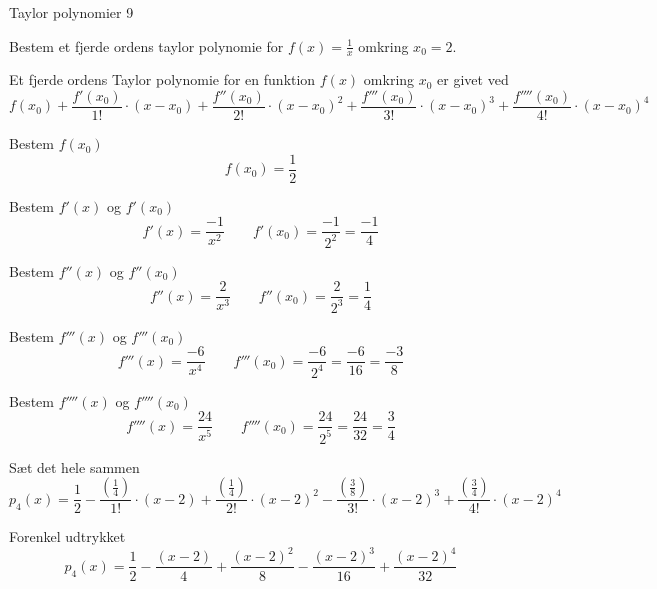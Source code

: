 \documentclass{article}
\begin{document}
\begin{exercise}{Taylor polynomier 9}
	
	Bestem et fjerde ordens taylor polynomie for $f(x) = \frac{1}{x}$
	omkring $x_0 = 2$.
	
	
	\hint
	Et fjerde ordens Taylor polynomie for en funktion $f(x)$
	omkring $x_0$ er givet ved
	\[
	f(x_0) + \frac{f'(x_0)}{1!} \cdot (x - x_0) 
	+ \frac{f''(x_0)}{2!} \cdot (x - x_0)^2 
	+ \frac{f'''(x_0)}{3!} \cdot (x - x_0)^3 
	+ \frac{f''''(x_0)}{4!} \cdot (x - x_0)^4
	\]
	
	
	\hint
	Bestem $f(x_0)$
	\[
	f(x_0)  = \frac{1}{2} 
	\]
	
	\hint
	Bestem $f'(x)$ og $f'(x_0)$
	\[
	f'(x) =  \frac{-1}{x^2} \qquad f'(x_0)= \frac{-1}{2^2} = \frac{-1}{4}
	\]
	
	\hint
	Bestem $f''(x)$ og $f''(x_0)$
	\[
	f''(x) = \frac{2}{x^3} \qquad f''(x_0)  = \frac{2}{2^3} = \frac{1}{4}
	\]
	
	\hint
	Bestem $f'''(x)$ og $f'''(x_0)$
	\[
	f'''(x) = \frac{-6}{x^4} \qquad f'''(x_0) =  \frac{-6}{2^4} = \frac{-6}{16} = \frac{-3}{8} 
	\]
	
	\hint
	Bestem $f''''(x)$ og $f''''(x_0)$
	\[
	f''''(x) = \frac{24}{x^5} \qquad f''''(x_0) = \frac{24}{2^5} = \frac{24}{32} = \frac{3}{4}
	\]
	
	\hint
	Sæt det hele sammen
	\[
	p_4(x) = \frac{1}{2} - \frac{(\frac{1}{4})}{1!} \cdot (x-2) + \frac{(\frac{1}{4}) }{2!} \cdot (x-2)^2 - \frac{(\frac{3}{8}) }{3!} \cdot (x-2)^3 + \frac{ (\frac{3}{4}) }{4!} \cdot (x-2)^4 	
	\]
	
	\hint
	Forenkel udtrykket
	\[
	p_4(x) = \frac{1}{2} - \frac{(x-2)}{4} + \frac{(x-2)^2}{8} - \frac{(x-2)^3}{16} + \frac{(x-2)^4}{32}
	\]
	
	
\end{exercise}
\end{document}
